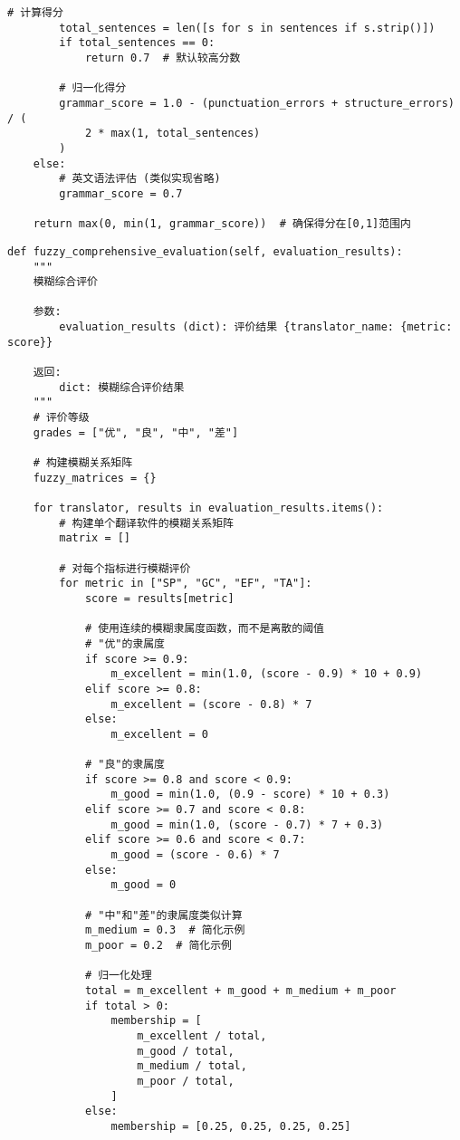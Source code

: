 \documentclass[bwprint]{cumcmthesis}
\begin{document}
\begin{appendices}
\begin{lstlisting}[style=pythonstyle, caption={语法正确性计算方法}]
        # 计算得分
        total_sentences = len([s for s in sentences if s.strip()])
        if total_sentences == 0:
            return 0.7  # 默认较高分数

        # 归一化得分
        grammar_score = 1.0 - (punctuation_errors + structure_errors) / (
            2 * max(1, total_sentences)
        )
    else:
        # 英文语法评估 (类似实现省略)
        grammar_score = 0.7

    return max(0, min(1, grammar_score))  # 确保得分在[0,1]范围内
\end{lstlisting}

\begin{lstlisting}[style=pythonstyle, caption={模糊综合评价方法}]
def fuzzy_comprehensive_evaluation(self, evaluation_results):
    """
    模糊综合评价

    参数:
        evaluation_results (dict): 评价结果 {translator_name: {metric: score}}

    返回:
        dict: 模糊综合评价结果
    """
    # 评价等级
    grades = ["优", "良", "中", "差"]

    # 构建模糊关系矩阵
    fuzzy_matrices = {}

    for translator, results in evaluation_results.items():
        # 构建单个翻译软件的模糊关系矩阵
        matrix = []

        # 对每个指标进行模糊评价
        for metric in ["SP", "GC", "EF", "TA"]:
            score = results[metric]

            # 使用连续的模糊隶属度函数，而不是离散的阈值
            # "优"的隶属度
            if score >= 0.9:
                m_excellent = min(1.0, (score - 0.9) * 10 + 0.9)
            elif score >= 0.8:
                m_excellent = (score - 0.8) * 7
            else:
                m_excellent = 0

            # "良"的隶属度 
            if score >= 0.8 and score < 0.9:
                m_good = min(1.0, (0.9 - score) * 10 + 0.3)
            elif score >= 0.7 and score < 0.8:
                m_good = min(1.0, (score - 0.7) * 7 + 0.3)
            elif score >= 0.6 and score < 0.7:
                m_good = (score - 0.6) * 7
            else:
                m_good = 0

            # "中"和"差"的隶属度类似计算
            m_medium = 0.3  # 简化示例
            m_poor = 0.2  # 简化示例

            # 归一化处理
            total = m_excellent + m_good + m_medium + m_poor
            if total > 0:
                membership = [
                    m_excellent / total,
                    m_good / total,
                    m_medium / total,
                    m_poor / total,
                ]
            else:
                membership = [0.25, 0.25, 0.25, 0.25]


\end{lstlisting}
\end{appendices}
\end{document}
